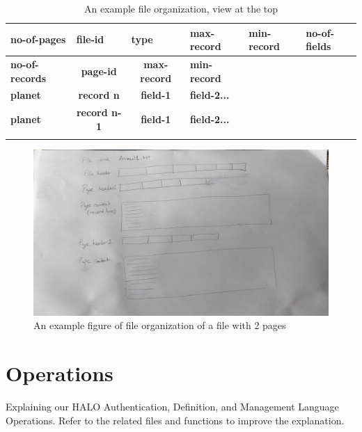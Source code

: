 \documentclass{article}
\begin{document}
\begin{table}[H]
\centering
\begin{tabular}{|l|c|c|l|c|c|}
\hline
\textbf{no-of-pages}   & \multicolumn{1}{l|}{\textbf{file-id}} & \multicolumn{1}{l|}{\textbf{type}}  & \multicolumn{1}{l|}{\textbf{max-record}} & \multicolumn{1}{l|}{\textbf{min-record}} & \multicolumn{1}{l|}{\textbf{no-of-fields}}\\ \hline
\textbf{no-of-records} & \textbf{page-id}  & \textbf{max-record}   & \textbf{min-record} &                                    \\ \hline
\textbf{planet} &  
\textbf{record n}   & 
\textbf{field-1}   &  \textbf{field-2...}                         \\ \hline
\textbf{planet} &  
\textbf{record n-1}   & 
\textbf{field-1}   &  \textbf{field-2...}                         \\ \hline                             \\ \hline
\end{tabular}

\label{tab:ex}
\caption{An example file organization, view at the top}
\end{table}

\begin{figure}[H]
    \centering
    \includegraphics[width=.8\textwidth]{file-organization.jpg}
    \caption{An example figure of file organization of a file with 2 pages}
\end{figure}

\section{Operations}
\label{sec:operations}
Explaining our HALO Authentication, Definition, and Management Language Operations. Refer to the related files and functions to improve the explanation.
\end{document}
